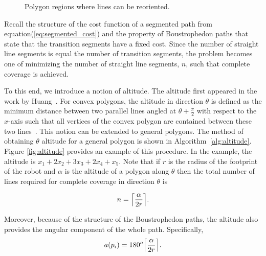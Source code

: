 \documentclass[../main.tex]{subfiles}
\begin{document}
\begin{figure}
	\centering
	\begin{subfigure}{0.5\linewidth}
		\centering
		
	\end{subfigure}%
	\begin{subfigure}{0.5\linewidth}
		\centering
		
	\end{subfigure}
	\caption{Polygon regions where lines can be reoriented.}
	\label{fig:reorder_regions}
\end{figure}

Recall the structure of the cost function of a segmented path from equation(\ref{eq:segmented_cost}) and the property of Boustrophedon paths that state that the transition segments have a fixed cost. Since the number of straight line segments is equal the number of transition segments, the problem becomes one of minimizing the number of straight line segments, $n$, such that complete coverage is achieved.

To this end, we introduce a notion of altitude. The altitude first appeared in the work by Huang~\cite{Huang2001optimal}. For convex polygons, the altitude in direction $\theta$ is defined as the minimum distance between two parallel lines angled at $\theta+\frac{\pi}{2}$ with respect to the $x$-axis such that all vertices of the convex polygon are contained between these two lines~\cite{Huang2001optimal}. This notion can be extended to general polygons. The method of obtaining $\theta$ altitude for a general polygon is shown in Algorithm~\ref{alg:altitude}. Figure \ref{fig:altitude} provides an example of this procedure. In the example, the altitude is $x_1 + 2x_2 + 3x_3 + 2x_4 + x_5$. Note that if $r$ is the radius of the footprint of the robot and $\alpha$ is the altitude of a polygon along $\theta$ then the total number of lines required for complete coverage in direction $\theta$ is

\begin{equation}
	n=\ceil*{\frac{\alpha}{2r}}.
\end{equation}

Moreover, because of the structure of the Boustrophedon paths, the altitude also provides the angular component of the whole path. Specifically, 
\begin{equation}
	a(p_i)=180^o\ceil*{\frac{\alpha}{2r}}.
\end{equation}
\end{document}
